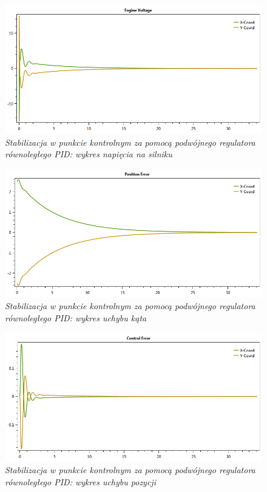 \documentclass[12pt, oneside]{report}
\theoremstyle{definition}
\begin{document}
\begin{figure}[H]
	\centering
		\includegraphics[width = 320pt]{LinePIDEV} 
		\caption{\textit{Stabilizacja w punkcie kontrolnym za pomocą podwójnego regulatora równoległego PID: wykres napięcia na silniku}}
		\label{plot:LinePIDEV}
\end{figure}

\begin{figure}[H]
	\centering
		\includegraphics[width = 320pt]{LinePIDCEP} 
		\caption{\textit{Stabilizacja w punkcie kontrolnym za pomocą podwójnego regulatora równoległego PID: wykres uchybu kąta}}
		\label{plot:LinePIDCEP}
\end{figure}

\begin{figure}[H]
	\centering
		\includegraphics[width = 320pt]{LinePIDCEA} 
		\caption{\textit{Stabilizacja w punkcie kontrolnym za pomocą podwójnego regulatora równoległego PID: wykres uchybu pozycji}}
		\label{plot:LinePIDCEA}
\end{figure}
\end{document}
